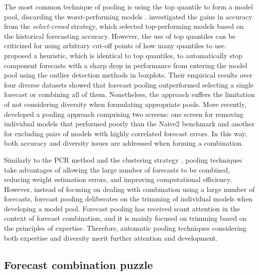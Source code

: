 \documentclass[11pt]{article}
\begin{document}
The most common technique of pooling is using the top quantile to form a model pool, discarding the worst-performing models \citep[e.g.,][]{Granger2004-sw}. \cite{Mannes2014-dl} investigated the gains in accuracy from the \textit{select-crowd} strategy, which selected top-performing models based on the historical forecasting accuracy. However, the use of top quantiles can be criticized for using arbitrary cut-off points of how many quantiles to use. \cite{Kourentzes2019-na} proposed a heuristic, which is identical to top quantiles, to automatically stop component forecasts with a sharp drop in performance from entering the model pool using the outlier detection methods in boxplots. Their empirical results over four diverse datasets showed that forecast pooling outperformed selecting a single forecast or combining all of them. Nonetheless, the approach suffers the limitation of not considering diversity when formulating appropriate pools. More recently, \cite{Lichtendahl2020-ut} developed a pooling approach comprising two screens: one screen for removing individual models that performed poorly than the Naive2 benchmark and another for excluding pairs of models with highly correlated forecast errors. In this way, both accuracy and diversity issues are addressed when forming a combination.

Similarly to the PCR method \citep{Stock2004-rq} and the clustering strategy \citep{Aiolfi2006-rh}, pooling techniques take advantages of allowing the large number of forecasts to be combined, reducing weight estimation errors, and improving computational efficiency. However, instead of focusing on dealing with combination using a large number of forecasts, forecast pooling deliberates on the trimming of individual models when developing a model pool. Forecast pooling has received scant attention in the context of forecast combination, and it is mainly focused on trimming based on the principles of expertise. Therefore, automatic pooling techniques considering both expertise and diversity merit further attention and development.

\subsection{Forecast combination puzzle}
\label{sec:forecast_combination_puzzle}
\end{document}
